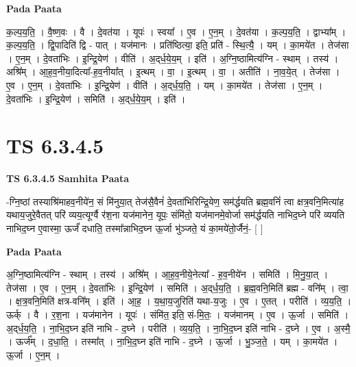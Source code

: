 \documentclass[17pt]{extarticle}
\begin{document}
\textbf{Pada Paata} \newline

क॒ल्प॒य॒ति॒ । वै॒ष्ण॒वः । वै । दे॒वत॑या । यूपः॑ । स्वया᳚ । ए॒व । ए॒न॒म् । दे॒वत॑या । क॒ल्प॒य॒ति॒ । द्वाभ्या᳚म् । क॒ल्प॒य॒ति॒ । द्वि॒पादिति॑ द्वि - पात् । यज॑मानः । प्रति॑ष्ठित्या॒ इति॒ प्रति॑ - स्थि॒त्यै॒ । यम् । का॒मये॑त । तेज॑सा । ए॒न॒म् । दे॒वता॑भिः । इ॒न्द्रि॒येण॑ । वीति॑ । अ॒द्‌र्ध॒ये॒य॒म् । इति॑ । अ॒ग्नि॒ष्ठामित्य॑ग्नि - स्थाम् । तस्य॑ । अश्रि᳚म् । आ॒ह॒व॒नीया॒दित्या᳚-ह॒व॒नीया᳚त् । इ॒त्थम् । वा॒ । इ॒त्थम् । वा॒ । अतीति॑ । ना॒व॒ये॒त् । तेज॑सा । ए॒व । ए॒न॒म् । दे॒वता॑भिः । इ॒न्द्रि॒येण॑ । वीति॑ । अ॒द्‌र्ध॒य॒ति॒ । यम् । का॒मये॑त । तेज॑सा । ए॒न॒म् । दे॒वता॑भिः । इ॒न्द्रि॒येण॑ । समिति॑ । अ॒द्‌र्ध॒ये॒य॒म् । इति॑ ।  \newline




\section*{ TS 6.3.4.5 }

\textbf{TS 6.3.4.5 } \newline
\textbf{Samhita Paata} \newline

-ग्नि॒ष्ठां तस्याश्रि॑माहव॒नीये॑न॒ सं मि॑नुया॒त् तेज॑सै॒वैनं॑ दे॒वता॑भिरिन्द्रि॒येण॒ सम॑र्द्धयति ब्रह्म॒वनिं॑ त्वा क्षत्र॒वनि॒मित्या॑ह यथाय॒जुरे॒वैतत् परि॑ व्यय॒त्यूर्ग्वै र॑श॒ना यज॑मानेन॒ यूपः॒ संमि॑तो॒ यज॑मानमे॒वोर्जा सम॑र्द्धयति नाभिद॒घ्ने परि॑ व्ययति नाभिद॒घ्न ए॒वास्मा॒ ऊर्जं॑ दधाति॒ तस्मा᳚न्नाभिद॒घ्न ऊ॒र्जा भु॑ञ्जते॒ यं का॒मये॑तो॒र्जैनं॒- [  ] \newline

\textbf{Pada Paata} \newline

अ॒ग्नि॒ष्ठामित्य॑ग्नि - स्थाम् । तस्य॑ । अश्रि᳚म् । आ॒ह॒व॒नीये॒नेत्या᳚ - ह॒व॒नीये॑न । समिति॑ । मि॒नु॒या॒त् । तेज॑सा । ए॒व । ए॒न॒म् । दे॒वता॑भिः । इ॒न्द्रि॒येण॑ । समिति॑ । अ॒द्‌र्ध॒य॒ति॒ । ब्र॒ह्म॒वनि॒मिति॑ ब्रह्म - वनि᳚म् । त्वा॒ । क्ष॒त्र॒वनि॒मिति॑ क्षत्र-वनि᳚म् । इति॑ । आ॒ह॒ । य॒था॒य॒जुरिति॑ यथा-य॒जुः । ए॒व । ए॒तत् । परीति॑ । व्य॒य॒ति॒ । ऊर्क् । वै । र॒श॒ना । यज॑मानेन । यूपः॑ । संमि॑त॒ इति॒ सं-मि॒तः॒ । यज॑मानम् । ए॒व । ऊ॒र्जा । समिति॑ । अ॒द्‌र्ध॒य॒ति॒ । ना॒भि॒द॒घ्न इति॑ नाभि - द॒घ्ने । परीति॑ । व्य॒य॒ति॒ । ना॒भि॒द॒घ्न इति॑ नाभि - द॒घ्ने । ए॒व । अ॒स्मै॒ । ऊर्ज᳚म् । द॒धा॒ति॒ । तस्मा᳚त् । ना॒भि॒द॒घ्न इति॑ नाभि - द॒घ्ने । ऊ॒र्जा । भु॒ञ्ज॒ते॒ । यम् । का॒मये॑त । ऊ॒र्जा । ए॒न॒म् ।  \newline
\end{document}
